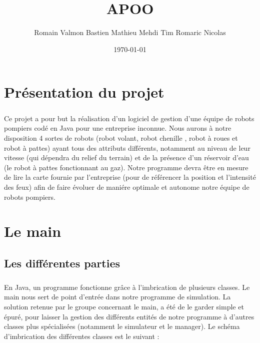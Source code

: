 \documentclass[10pt]{report}
\title
{APOO}
\author{\bsc{Simulation d'une équipe de robots pompiers}\andcr\andcr\andcr\andcr\andcr\andcr\andcr\bsc{Koenig} Romain\andcr\bsc{Leymarie} Valmon\andcr\bsc{Van Eenaeme} Bastien\andcr\bsc{Gaudron} Mathieu\andcr\bsc{Domec} Mehdi\andcr\bsc{De Vos} Tim\andcr\bsc{Jodin} Romaric\andcr\bsc{Carren} Nicolas}
\date{\today}
\begin{document}
\maketitle
\chapter{Présentation du projet}
\paragraph{}Ce projet a pour but la réalisation d'un logiciel de gestion d'une équipe de robots pompiers codé en Java pour une entreprise inconnue. Nous aurons à notre disposition 4 sortes de robots (robot volant, robot chenille , robot à roues et robot à pattes) ayant tous des attributs différents, notamment au niveau de leur vitesse (qui dépendra du relief du terrain) et de la présence d'un réservoir d'eau (le robot à pattes fonctionnant au gaz). Notre programme devra être en mesure de lire la carte fournie par l'entreprise (pour de référencer la position et l'intensité des feux) afin de faire évoluer de maniére optimale et autonome notre équipe de robots pompiers.


\chapter{Le main}
\section{Les différentes parties}
\paragraph{}En Java, un programme fonctionne grâce à l'imbrication de plusieurs classes.
Le main nous sert de point d'entrée dans notre programme de simulation. 
La solution retenue par le groupe concernant le main, a été de le garder simple et épuré, pour laisser la gestion des différents entités de notre programme à d'autres classes plus spécialisées (notamment le simulateur et le manager). Le schéma d'imbrication des différentes classes est le suivant : 
\end{document}

